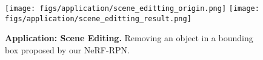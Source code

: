 \begin{figure}[t]
    \centering
    \texttt{[image: figs/application/scene\_editting\_origin.png]}\hfill
    \texttt{[image: figs/application/scene\_editting\_result.png]}
    \vspace{-0.1in}
    \caption{\textbf{Application: Scene Editing.} %
    Removing an object in a bounding box proposed by our NeRF-RPN. }
    \vspace{-0.2in}
    \label{fig:edit}
\end{figure}
